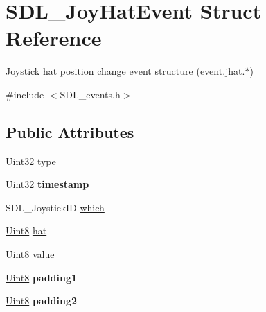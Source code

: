 \hypertarget{struct_s_d_l___joy_hat_event}{}\section{S\+D\+L\+\_\+\+Joy\+Hat\+Event Struct Reference}
\label{struct_s_d_l___joy_hat_event}


Joystick hat position change event structure (event.\+jhat.$\ast$)  




{\ttfamily \#include $<$S\+D\+L\+\_\+events.\+h$>$}

\subsection*{Public Attributes}
\begin{DoxyCompactItemize}
\item 
\hyperlink{_s_d_l__stdinc_8h_add440eff171ea5f55cb00c4a9ab8672d}{Uint32} \hyperlink{struct_s_d_l___joy_hat_event_ac583dafab46c44354e210a542aff57cc}{type}
\item 
\hypertarget{struct_s_d_l___joy_hat_event_ade58ecb3e75aad4ef9809f040519a021}{}\hyperlink{_s_d_l__stdinc_8h_add440eff171ea5f55cb00c4a9ab8672d}{Uint32} {\bfseries timestamp}\label{struct_s_d_l___joy_hat_event_ade58ecb3e75aad4ef9809f040519a021}

\item 
S\+D\+L\+\_\+\+Joystick\+I\+D \hyperlink{struct_s_d_l___joy_hat_event_ac9d9bb179f9116d16b3da47cacd74b55}{which}
\item 
\hyperlink{_s_d_l__stdinc_8h_a2944638813a090aa23e62f4da842c3e2}{Uint8} \hyperlink{struct_s_d_l___joy_hat_event_ab1b54a6d1091e583e856f86b5af1e2f6}{hat}
\item 
\hyperlink{_s_d_l__stdinc_8h_a2944638813a090aa23e62f4da842c3e2}{Uint8} \hyperlink{struct_s_d_l___joy_hat_event_a52b179a34407449941b61d988ca72ef4}{value}
\item 
\hypertarget{struct_s_d_l___joy_hat_event_afbe72b6702cf7f70ccbe206737ab2e49}{}\hyperlink{_s_d_l__stdinc_8h_a2944638813a090aa23e62f4da842c3e2}{Uint8} {\bfseries padding1}\label{struct_s_d_l___joy_hat_event_afbe72b6702cf7f70ccbe206737ab2e49}

\item 
\hypertarget{struct_s_d_l___joy_hat_event_adaca3e99773130ae456690ba83feb420}{}\hyperlink{_s_d_l__stdinc_8h_a2944638813a090aa23e62f4da842c3e2}{Uint8} {\bfseries padding2}\label{struct_s_d_l___joy_hat_event_adaca3e99773130ae456690ba83feb420}

\end{DoxyCompactItemize}


